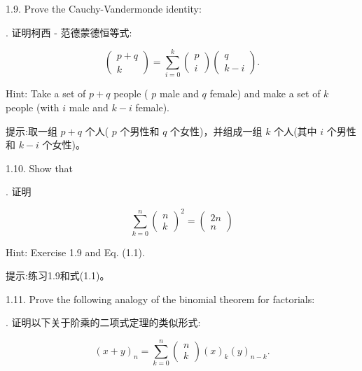 \documentclass[10pt]{article}
\begin{document}
1.9. Prove the Cauchy-Vandermonde identity:

\begin{tcolorbox}. 证明柯西 - 范德蒙德恒等式:
\end{tcolorbox}

\[
\left( \begin{matrix} p + q \\  k \end{matrix}\right)  = \mathop{\sum }\limits_{{i = 0}}^{k}\left( \begin{array}{l} p \\  i \end{array}\right) \left( \begin{matrix} q \\  k - i \end{matrix}\right) .
\]

Hint: Take a set of \(p + q\) people ( \(p\) male and \(q\) female) and make a set of \(k\) people (with \(i\) male and \(k - i\) female).

\begin{tcolorbox}\relax
提示:取一组 \(p + q\) 个人( \(p\) 个男性和 \(q\) 个女性)，并组成一组 \(k\) 个人(其中 \(i\) 个男性和 \(k - i\) 个女性)。
\end{tcolorbox}

1.10. Show that

\begin{tcolorbox}. 证明
\end{tcolorbox}

\[
\mathop{\sum }\limits_{{k = 0}}^{n}{\left( \begin{array}{l} n \\  k \end{array}\right) }^{2} = \left( \begin{matrix} {2n} \\  n \end{matrix}\right)
\]

Hint: Exercise 1.9 and Eq. (1.1).

\begin{tcolorbox}\relax
提示:练习1.9和式(1.1)。
\end{tcolorbox}

1.11. Prove the following analogy of the binomial theorem for factorials:

\begin{tcolorbox}. 证明以下关于阶乘的二项式定理的类似形式:
\end{tcolorbox}

\[
{\left( x + y\right) }_{n} = \mathop{\sum }\limits_{{k = 0}}^{n}\left( \begin{array}{l} n \\  k \end{array}\right) {\left( x\right) }_{k}{\left( y\right) }_{n - k}.
\]
\end{document}
